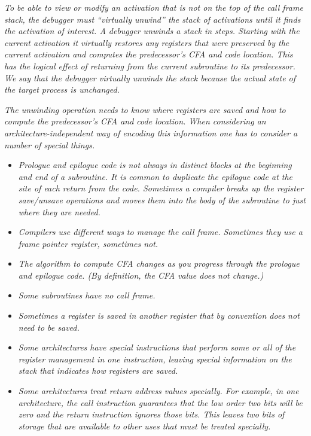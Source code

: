 \textit{To be able to view or modify an activation that is not
on the top of the call frame stack, the debugger must
``virtually unwind'' the stack of activations until
it finds the activation of interest.  A debugger unwinds
a stack in steps. Starting with the current activation it
virtually restores any registers that were preserved by the
current activation and computes the predecessor’s CFA and
code location. This has the logical effect of returning from
the current subroutine to its predecessor. We say that the
debugger virtually unwinds the stack because the actual state
of the target process is unchanged.}

\textit{The unwinding operation needs to know where registers are
saved and how to compute the predecessor’s CFA and code
location. When considering an architecture-independent way
of encoding this information one has to consider a number of
special things.}


\begin{itemize} %

\item \textit{Prologue and epilogue code is not always in distinct blocks
at the beginning and end of a subroutine. It is common
to duplicate the epilogue code at the site of each return
from the code. Sometimes a compiler breaks up the register
save/unsave operations and moves them into the body of the
subroutine to just where they are needed.}


\item \textit{Compilers use different ways to manage the call
frame. Sometimes they use a frame pointer register, sometimes
not.}

\item \textit{The algorithm to compute CFA changes as you progress through
the prologue and epilogue code. (By definition, the CFA value
does not change.)}

\item \textit{Some subroutines have no call frame.}

\item \textit{Sometimes a register is saved in another register that by
convention does not need to be saved.}

\item \textit{Some architectures have special instructions that perform
some or all of the register management in one instruction,
leaving special information on the stack that indicates how
registers are saved.}

\item \textit{Some architectures treat return address values specially. For
example, in one architecture, the call instruction guarantees
that the low order two bits will be zero and the return
instruction ignores those bits. This leaves two bits of
storage that are available to other uses that must be treated
specially.}


\end{itemize}


